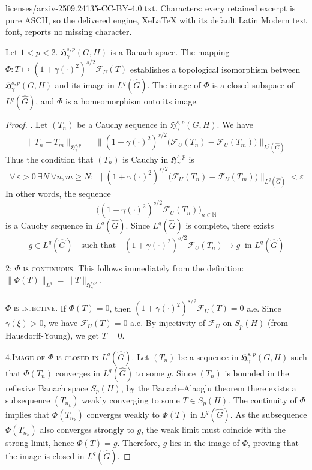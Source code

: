 \documentclass[10pt,a4paper]{amsart}
\newcommand{\F}{\mathcal{F}}
\newcommand{\Ghat}{\widehat{G}}
\begin{document}
licenses/arxiv-2509.24135-CC-BY-4.0.txt. Characters: every retained excerpt is pure ASCII, so the delivered engine, XeLaTeX with its default Latin Modern text font, reports no missing character.
\begin{theorem}
\label{thm:topological-iso}
Let $1 < p < 2$. $\mathfrak{H}_\gamma^{s,p}(G, H)$ is a Banach space. The mapping \\$\Phi : T \mapsto (1+\gamma(\cdot)^2)^{s/2}\F_U(T)$ establishes a topological isomorphism between $\mathfrak{H}_\gamma^{s,p}(G, H)$ and its image in $L^q(\hat{G})$. The image of $\Phi$ is a closed subspace of $L^q(\hat{G})$, and $\Phi$ is a homeomorphism onto its image.
\end{theorem}

\begin{proof}

. Let $(T_n)$ be a Cauchy sequence in $\mathfrak{H}_\gamma^{s,p}(G,H)$. We have
\[
\|T_n - T_m\|_{\mathfrak{H}_\gamma^{s,p}}
  = \big\|(1+\gamma(\cdot)^2)^{s/2}\big(\F_U(T_n)-\F_U(T_m)\big)\big\|_{L^q(\widehat G)}
\]
Thus the condition that $(T_n)$ is Cauchy in $\mathfrak{H}_\gamma^{s,p}$ is 
\[
\forall\,\varepsilon>0\ \exists N\ \forall n,m\ge N:\ 
\big\|(1+\gamma(\cdot)^2)^{s/2}\big(\F_U(T_n)-\F_U(T_m)\big)\big\|_{L^q(\widehat G)}<\varepsilon
\]
In other words, the sequence
\[
\big((1+\gamma(\cdot)^2)^{s/2}\F_U(T_n)\big)_{n\in\mathbb N}
\]
is a Cauchy sequence in $L^q(\widehat G)$. Since $L^q(\widehat G)$ is complete, there exists
\[
g\in L^q(\widehat G)\quad\text{such that}\quad
(1+\gamma(\cdot)^2)^{s/2}\F_U(T_n)\to g \ \text{ in }L^q(\widehat G)
\]

\bigskip

\textsc{2: $\Phi$ is continuous.} This follows immediately from the definition: $\|\Phi(T)\|_{L^q} = \|T\|_{\mathfrak{H}_\gamma^{s,p}}$.

\bigskip

\textsc{$\Phi$ is injective.} If $\Phi(T) = 0$, then $(1 + \gamma(\cdot)^2)^{s/2} \F_U(T) = 0$ a.e. Since $\gamma(\xi) > 0$, we have $\F_U(T) = 0$ a.e. By injectivity of $\F_U$ on $S_p(H)$ (from Hausdorff-Young), we get $T = 0$.

\bigskip

\textsc{4.Image of $\Phi$ is closed in $L^q(\Ghat)$.}  
Let $(T_n)$ be a sequence in $\mathfrak{H}_\gamma^{s,p}(G,H)$ such that $\Phi(T_n)$ converges in $L^q(\hat{G})$ to some $g$. Since $(T_n)$ is bounded in the reflexive Banach space $S_p(H)$, by the Banach--Alaoglu theorem there exists a subsequence $(T_{n_k})$ weakly converging to some $T \in S_p(H)$. The continuity of $\Phi$ implies that $\Phi(T_{n_k})$ converges weakly to $\Phi(T)$ in $L^q(\hat{G})$. As the subsequence $\Phi(T_{n_k})$ also converges strongly to $g$, the weak limit must coincide with the strong limit, hence $\Phi(T) = g$. Therefore, $g$ lies in the image of $\Phi$, proving that the image is closed in $L^q(\hat{G})$.


\end{proof}
\end{document}
